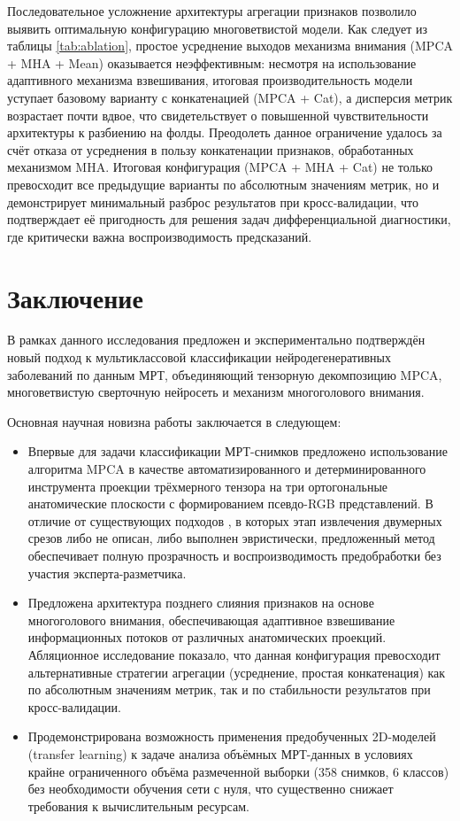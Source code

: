 \documentclass[eqsecnum, authorsinfo]{kioj6}
\begin{document}
Последовательное усложнение архитектуры агрегации признаков позволило выявить оптимальную конфигурацию многоветвистой модели. 
Как следует из таблицы \ref{tab:ablation}, простое усреднение выходов механизма внимания (MPCA + MHA + Mean) оказывается неэффективным: несмотря на использование 
адаптивного механизма взвешивания, итоговая производительность модели уступает базовому варианту с конкатенацией (MPCA + Cat), а дисперсия метрик возрастает 
почти вдвое, что свидетельствует о повышенной чувствительности архитектуры к разбиению на фолды. Преодолеть данное ограничение удалось за счёт отказа 
от усреднения в пользу конкатенации признаков, обработанных механизмом MHA. Итоговая конфигурация (MPCA + MHA + Cat) не только превосходит все 
предыдущие варианты по абсолютным значениям метрик, но и демонстрирует минимальный разброс результатов при кросс-валидации, что подтверждает её 
пригодность для решения задач дифференциальной диагностики, где критически важна воспроизводимость предсказаний.



\section{Заключение}
В рамках данного исследования предложен и экспериментально подтверждён новый подход к мультиклассовой классификации нейродегенеративных заболеваний по
данным МРТ, объединяющий тензорную декомпозицию MPCA, многоветвистую сверточную нейросеть и механизм многоголового внимания.

Основная научная новизна работы заключается в следующем:
\begin{itemize}
    \item Впервые для задачи классификации МРТ-снимков предложено использование алгоритма MPCA в качестве автоматизированного и детерминированного инструмента проекции трёхмерного тензора на три ортогональные анатомические плоскости с формированием псевдо-RGB представлений. В отличие от существующих подходов \cite{1,2,3,4,5}, в которых этап извлечения двумерных срезов либо не описан, либо выполнен эвристически, предложенный метод обеспечивает полную прозрачность и воспроизводимость предобработки без участия эксперта-разметчика.
    \item Предложена архитектура позднего слияния признаков на основе многоголового внимания, обеспечивающая адаптивное взвешивание информационных потоков от различных анатомических проекций. Абляционное исследование показало, что данная конфигурация превосходит альтернативные стратегии агрегации (усреднение, простая конкатенация) как по абсолютным значениям метрик, так и по стабильности результатов при кросс-валидации.
    \item Продемонстрирована возможность применения предобученных 2D-моделей (transfer learning) к задаче анализа объёмных МРТ-данных в условиях крайне ограниченного объёма размеченной выборки (358 снимков, 6 классов) без необходимости обучения сети с нуля, что существенно снижает требования к вычислительным ресурсам.
\end{itemize}
\end{document}
